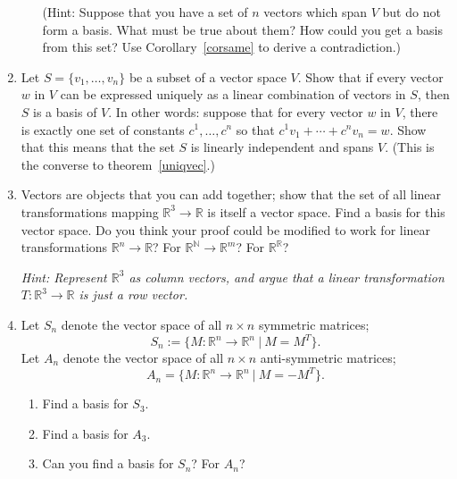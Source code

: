 \begin{enumerate}
\begin{enumerate}
(Hint: Suppose that you have a set of \(n\) vectors which span \(V\) but do not form a basis. What must be true about them? How could you get a basis from this set? Use Corollary~\ref{corsame} to derive a contradiction.)
\end{enumerate}


\item Let $S=\{v_1, \ldots, v_n\}$ be a subset of a vector space $V$.  Show that if every vector $w$ in $V$ can be expressed uniquely as a linear combination of vectors in $S$, then $S$ is a basis of $V$. In other words: suppose that for every vector \(w\) in \(V\), there is exactly one set of constants \(c^1, \ldots, c^n\) so that \(c^1v_1+\cdots+c^nv_n=w\). Show that this means that the set \(S\) is linearly independent and spans \(V\). (This is the converse to theorem~\ref{uniqvec}.)


\item Vectors are objects that you can add together; show that the set of all linear transformations mapping 
$\mathbb{R}^3\rightarrow \mathbb{R}$ is itself a vector space.  Find a basis for this vector space.  Do you think your proof could be modified to work for linear transformations $\mathbb{R}^n\rightarrow \mathbb{R}$? For $\mathbb{R}^{\mathbb{N}}\rightarrow \mathbb{R}^m$? For $\mathbb{R}^{\mathbb{R}}$?

\emph{Hint: Represent $\mathbb{R}^3$ as column vectors, and argue that a linear transformation $T \colon \mathbb{R}^3\rightarrow \mathbb{R}$ is just a row vector. 
}


\item Let $S_n$ denote the vector space of all $n \times n$ symmetric matrices;  \[S_n:=\{M:\mathbb{R}^n\to \mathbb{R}^n ~ |~ M = M^T\}.\] Let $A_n$ denote the vector space of all $n \times n$ anti-symmetric matrices; 
\[A_n=\{M:\mathbb{R}^n\to \mathbb{R}^n ~ |~ M = -M^T\}.\]
\begin{enumerate}
\item Find a basis for $S_3$.

\item Find a basis for $A_3$.

\item %
Can you find a basis for $S_n$? For $A_n$?


\end{enumerate}
\end{enumerate}

